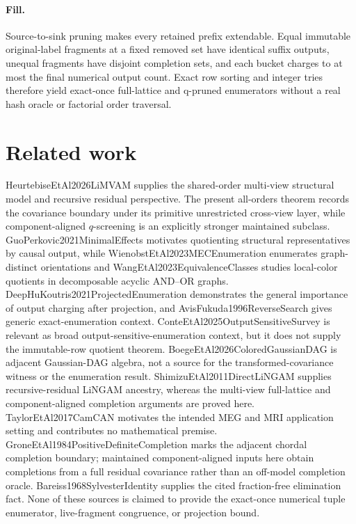 \documentclass{article}
\begin{document}
\paragraph{Fill.} Source-to-sink pruning makes every retained prefix extendable. Equal immutable original-label fragments at a fixed removed set have identical suffix outputs, unequal fragments have disjoint completion sets, and each bucket charges to at most the final numerical output count. Exact row sorting and integer tries therefore yield exact-once full-lattice and q-pruned enumerators without a real hash oracle or factorial order traversal.

\section{Related work}

HeurtebiseEtAl2026LiMVAM supplies the shared-order multi-view structural model and recursive residual perspective. The present all-orders theorem records the covariance boundary under its primitive unrestricted cross-view layer, while component-aligned \(q\)-screening is an explicitly stronger maintained subclass. GuoPerkovic2021MinimalEffects motivates quotienting structural representatives by causal output, while WienobstEtAl2023MECEnumeration enumerates graph-distinct orientations and WangEtAl2023EquivalenceClasses studies local-color quotients in decomposable acyclic AND--OR graphs. DeepHuKoutris2021ProjectedEnumeration demonstrates the general importance of output charging after projection, and AvisFukuda1996ReverseSearch gives generic exact-enumeration context. ConteEtAl2025OutputSensitiveSurvey is relevant as broad output-sensitive-enumeration context, but it does not supply the immutable-row quotient theorem. BoegeEtAl2026ColoredGaussianDAG is adjacent Gaussian-DAG algebra, not a source for the transformed-covariance witness or the enumeration result. ShimizuEtAl2011DirectLiNGAM supplies recursive-residual LiNGAM ancestry, whereas the multi-view full-lattice and component-aligned completion arguments are proved here. TaylorEtAl2017CamCAN motivates the intended MEG and MRI application setting and contributes no mathematical premise. GroneEtAl1984PositiveDefiniteCompletion marks the adjacent chordal completion boundary; maintained component-aligned inputs here obtain completions from a full residual covariance rather than an off-model completion oracle. Bareiss1968SylvesterIdentity supplies the cited fraction-free elimination fact. None of these sources is claimed to provide the exact-once numerical tuple enumerator, live-fragment congruence, or projection bound.
\end{document}
